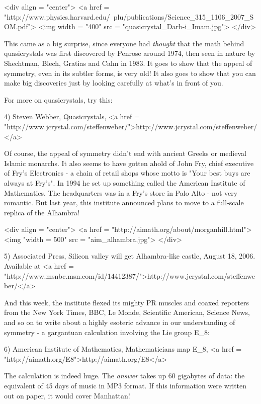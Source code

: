 <div align = "center">
<a href = "http://www.physics.harvard.edu/~plu/publications/Science_315_1106_2007_SOM.pdf">
<img width = "400" src = "quasicrystal_Darb-i_Imam.jpg">
</div>

This came as a big surprise, since everyone had \emph{thought} that the 
math behind quasicrystals was first discovered by Penrose around 1974, 
then seen in nature by Shechtman, Blech, Gratias and Cahn in 1983.
It goes to show that the appeal of symmetry, even in its subtler forms,
is very old!  It also goes to show that you can make big discoveries
just by looking carefully at what's in front of you.


For more on quasicrystals, try this:

4) Steven Webber, Quasicrystals, <a href = "http://www.jcrystal.com/steffenweber/">http://www.jcrystal.com/steffenweber/</a>

Of course, the appeal of symmetry didn't end with ancient Greeks or
medieval Islamic monarchs.  It also seems to have gotten ahold of John
Fry, chief executive of Fry's Electronics - a chain of retail shops
whose motto is "Your best buys are always at Fry's".  In 1994 he 
set up something called the American Institute of Mathematics.  The
headquarters was in a Fry's store in Palo Alto - not very romantic.  
But last year, this institute announced plans to move to a full-scale 
replica of the Alhambra!

<div align = "center">
<a href = "http://aimath.org/about/morganhill.html">
<img "width = 500" src = "aim_alhambra.jpg">
</div>

5) Associated Press, Silicon valley will get Alhambra-like castle,
August 18, 2006.  Available at <a href = "http://www.msnbc.msn.com/id/14412387/">http://www.jcrystal.com/steffenweber/</a>
 
And this week, the institute flexed its mighty PR muscles and coaxed 
reporters from the New York Times, BBC, Le Monde, Scientific American, 
Science News, and so on to write about a highly esoteric advance in 
our understanding of symmetry - a gargantuan calculation involving the 
Lie group E_{8}:

6) American Institute of Mathematics, Mathematicians map E_{8}, 
<a href = "http://aimath.org/E8">http://aimath.org/E8</a>

The calculation is indeed huge.  The \emph{answer} takes up 60 gigabytes of
data: the equivalent of 45 days of music in MP3 format.  If this 
information were written out on paper, it would cover Manhattan!

